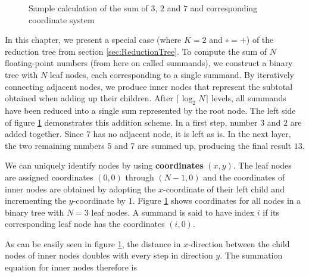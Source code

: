 \newcommand{\numLevels}{\lceil \log_2 N \rceil}
\newcommand{\ffs}{\textrm{ffs}}
\newcommand{\nodesum}{\textrm{sum}\,}

\begin{figure}[H]
\centering
{}
\caption{Sample calculation of the sum of $3$, $2$ and $7$ and corresponding coordinate system}
\label{fig:coordinateExample}
\end{figure}

In this chapter, we present a special case (where $K = 2$ and $\circ = +$) of the reduction tree from section \ref{sec:ReductionTree}.
To compute the sum of $N$ floating-point numbers (from here on called summands), we construct a binary tree with $N$ leaf nodes,
each corresponding to a single summand.
By iteratively connecting adjacent nodes, we produce inner nodes that represent the subtotal obtained when adding up their children.
After $\numLevels$ levels, all summands have been reduced into a single sum represented by the root node.
The left side of figure \ref{fig:coordinateExample} demonstrates this addition scheme. In a first step, number $3$ and $2$ are added together.
Since $7$ has no adjacent node, it is left as is. In the next layer, the two remaining numbers $5$ and $7$ are summed up, producing the final
result $13$.

We can uniquely identify nodes by using \textbf{coordinates} $(x, y)$. The leaf nodes are assigned coordinates
$(0,0)$ through $(N-1,0)$ and the coordinates of inner nodes are obtained by adopting the $x$-coordinate of their left child and incrementing
the $y$-coordinate by $1$. Figure \ref{fig:coordinateExample} shows coordinates for all nodes in a binary tree with $N = 3$ leaf nodes.
A summand is said to have index $i$ if its corresponding leaf node has the coordinates $(i,0)$.

As can be easily seen in figure \ref{fig:coordinateExample}, the distance in $x$-direction between the child nodes of inner nodes doubles
with every step in direction $y$. The summation equation for inner nodes therefore is

